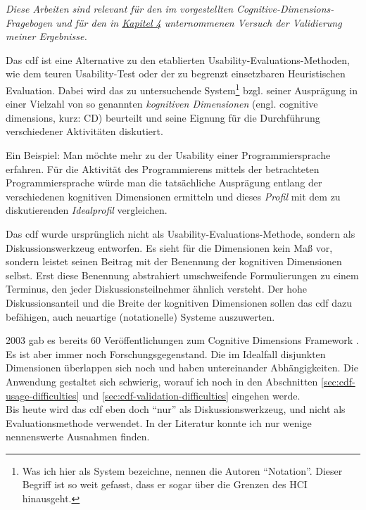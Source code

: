 \begin{important}
\textit{Diese Arbeiten sind relevant für den im  vorgestellten Cognitive-Dimensions-Fragebogen und für den in \href{sec:Ergebnisse}{Kapitel 4} unternommenen Versuch der Validierung meiner Ergebnisse.}

Das \gls{cdf} ist eine Alternative zu den etablierten Usability-Evaluations-Methoden, wie dem teuren \citep{Faulkner:2003wn} Usability-Test oder der zu begrenzt einsetzbaren \citep{Nielsen:2005uv} Heuristischen Evaluation. Dabei wird das zu untersuchende System\footnote{Was ich hier als System bezeichne, nennen die Autoren ``Notation''. Dieser Begriff ist so weit gefasst, dass er sogar über die Grenzen des HCI hinausgeht.} bzgl. seiner Ausprägung in einer Vielzahl von so genannten \emph{kognitiven Dimensionen} (engl. cognitive dimensions, kurz: CD) beurteilt und seine Eignung für die Durchführung verschiedener Aktivitäten diskutiert.

Ein Beispiel: Man möchte mehr zu der Usability einer Programmiersprache erfahren. Für die Aktivität des Programmierens mittels der betrachteten Programmiersprache würde man die tatsächliche Ausprägung entlang der verschiedenen kognitiven Dimensionen ermitteln und dieses \emph{Profil} mit dem zu diskutierenden \emph{Idealprofil} vergleichen.

Das \gls{cdf} wurde ursprünglich nicht als Usability-Evaluations-Methode, sondern als Diskussionswerkzeug entworfen. Es sieht für die Dimensionen kein Maß vor, sondern leistet seinen Beitrag mit der Benennung der kognitiven Dimensionen selbst. Erst diese Benennung abstrahiert umschweifende Formulierungen zu einem Terminus, den jeder Diskussionsteilnehmer ähnlich versteht. Der hohe Diskussionsanteil und die Breite der kognitiven Dimensionen sollen das \gls{cdf} dazu befähigen, auch neuartige (notationelle) Systeme auszuwerten. \citep{GreenCognitive}

2003 gab es bereits 60 Veröffentlichungen zum Cognitive Dimensions Framework \citep{carroll2003hci}. Es ist aber immer noch Forschungsgegenstand. Die im Idealfall disjunkten Dimensionen überlappen sich noch und haben untereinander Abhängigkeiten. Die Anwendung gestaltet sich schwierig, worauf ich noch in den Abschnitten \ref{sec:cdf-usage-difficulties} und \ref{sec:cdf-validation-difficulties} eingehen werde.\\
Bis heute wird das \gls{cdf} eben doch ``nur'' als Diskussionswerkzeug, und nicht als Evaluationsmethode verwendet. In der Literatur konnte ich nur wenige nennenswerte Ausnahmen \citep{roast2000formal,carroll2003hci} finden. 



\end{important}
